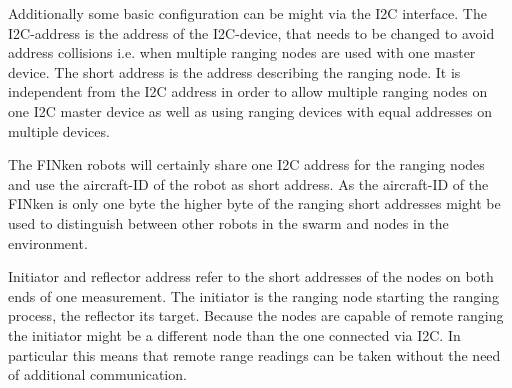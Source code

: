 Additionally some basic configuration can be might via the I2C interface.
The I2C-address is the address of the I2C-device, that needs to be changed to avoid address collisions i.e. when multiple ranging nodes are used with one master device.
The short address is the address describing the ranging node.
It is independent from the I2C address in order to allow multiple ranging nodes on one I2C master device as well as using ranging devices with equal addresses on multiple devices.

The FINken robots will certainly share one I2C address for the ranging nodes and use the aircraft-ID of the robot as short address.
As the aircraft-ID of the FINken is only one byte the higher byte of the ranging short addresses might be used to distinguish between other robots in the swarm and nodes in the environment.

Initiator and reflector address refer to the short addresses of the nodes on both ends of one measurement.
The initiator is the ranging node starting the ranging process, the reflector its target.
Because the nodes are capable of remote ranging the initiator might be a different node than the one connected via I2C.
In particular this means that remote range readings can be taken without the need of additional communication.

